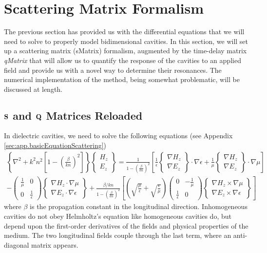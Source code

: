 \section{Scattering Matrix Formalism}
The previous section has provided us with the differential equations that 
we will need to solve to properly model bidimensional cavities. In this section, 
we will set up a scattering matrix (\gls{sMatrix}) formalism, augmented by the
time-delay matrix \textit{\gls{qMatrix}}
that will allow us to quantify the response of the cavities
to an applied field and provide us with a novel way to determine their resonances. 
The numerical implementation of the method, being somewhat problematic, will 
be discussed at length. 

\subsection{$\mathbf{S}$ and $\mathbf{Q}$ Matrices Reloaded}
In dielectric cavities, we need to solve the following equations (see Appendix \ref{sec:app.basicEquationScattering})
  \begin{multline}
    \left\{\nabla^2+k^2n^2\left[1-\left(\frac{\beta}{kn}\right)^2\right]\right\}\begin{Bmatrix} H_z \\ E_z \end{Bmatrix}
      = \frac{1}{1-\left(\frac{\beta}{kn}\right)^2}
	  \left[\frac{1}{\epsilon}\begin{Bmatrix} \nabla H_z \\ \nabla E_z \end{Bmatrix}\cdot\nabla\epsilon+\frac{1}{\mu}\begin{Bmatrix} \nabla  H_z \\ \nabla E_z \end{Bmatrix}\cdot\nabla\mu\right]
      \\-\begin{pmatrix} \frac{1}{\mu} & 0 \\ 0 &\frac{1}{\epsilon}\end{pmatrix} \begin{Bmatrix} \nabla H_z \cdot\nabla\mu \\ \nabla E_z\cdot\nabla\epsilon \end{Bmatrix}
      +\frac{\beta/kn}{1-\left(\frac{\beta}{kn}\right)^2}\left[\left(\sqrt{\frac{\mu}{\epsilon}}+\sqrt{\frac{\epsilon}{\mu}}\right)\begin{pmatrix}0 & -\frac{1}{\mu}\\\frac{1}{\epsilon} & 0\end{pmatrix}
      \begin{Bmatrix} \nabla H_z\times\nabla\mu \\ \nabla E_z\times\nabla\epsilon\end{Bmatrix}\right]
  \end{multline}
where $\beta$ is the propagation constant in the longitudinal direction.
Inhomogeneous cavities do not obey Helmholtz's equation like homogeneous
cavities do, but depend upon the first-order derivatives of the fields and 
physical properties of the medium. The two longitudinal fields
couple through the last term, where an anti-diagonal matrix appears.

